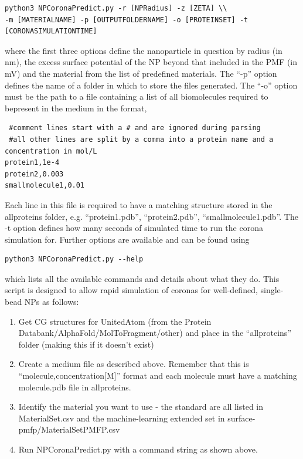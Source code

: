 \documentclass[10pt,a4paper,onecolumn]{report}
\begin{document}
\begin{lstlisting}
python3 NPCoronaPredict.py -r [NPRadius] -z [ZETA] \\
-m [MATERIALNAME] -p [OUTPUTFOLDERNAME] -o [PROTEINSET] -t [CORONASIMULATIONTIME]
\end{lstlisting}
 where the first three options define the nanoparticle in question by radius (in nm), the excess surface potential of the NP beyond that included in the PMF (in mV) and the material from the list of predefined materials. The ``-p'' option defines the name of a folder in which to store the files generated. The ``-o'' option must be the path to a file containing a list of all biomolecules required to bepresent in the medium in the format,
 \begin{lstlisting}
 #comment lines start with a # and are ignored during parsing
 #all other lines are split by a comma into a protein name and a concentration in mol/L
protein1,1e-4
protein2,0.003
smallmolecule1,0.01
\end{lstlisting}
Each line in this file is required to have a matching structure stored in the all\textunderscore proteins folder, e.g. ``protein1.pdb'', ``protein2.pdb'', ``smallmolecule1.pdb''. The -t option defines how many seconds of simulated time to run the corona simulation for. Further options are available and can be found using 
\begin{lstlisting}
python3 NPCoronaPredict.py --help
\end{lstlisting}
which lists all the available commands and details about what they do. This script is designed to allow rapid simulation of coronas for well-defined, single-bead NPs as follows:
\begin{enumerate}
\item Get CG structures for UnitedAtom (from the Protein Databank/AlphaFold/MolToFragment/other) and place in the ``all\textunderscore proteins'' folder (making this if it doesn't exist)
\item Create a medium file as described above. Remember that this is ``molecule,concentration[M]'' format and each molecule must have a matching molecule.pdb file in all\textunderscore proteins.
\item Identify the material you want to use - the standard are all listed in MaterialSet.csv and the machine-learning extended set in surface-pmfp/MaterialSetPMFP.csv
\item Run NPCoronaPredict.py with a command string as shown above. 
\end{enumerate}
 
\end{document}

